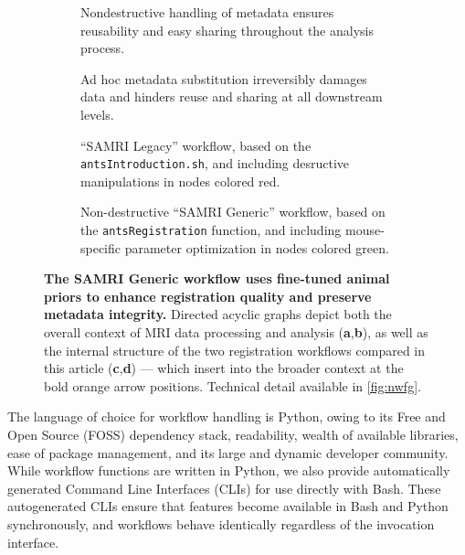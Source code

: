 \begin{figure*}[h!]
	\vspace{-1.8em}
	\begin{subfigure}{\textwidth}
		\centering
		\vspace{-3em}
		\caption{
			Nondestructive handling of metadata ensures reusability and easy sharing throughout the analysis process.
			}
		\label{fig:mdg}
	\vspace{-0.3em}
	\end{subfigure}
	\begin{subfigure}{\textwidth}
		\centering
		\vspace{-3em}
		\caption{
			Ad hoc metadata substitution irreversibly damages data and hinders reuse and sharing at all downstream levels.
			}
		\label{fig:mdb}
	\vspace{-0.5em}
	\end{subfigure}
	\begin{subfigure}{.39\textwidth}
		\centering
		\vspace{-0.8em}
		\caption{
			“SAMRI Legacy” workflow, based on the \textcolor{mg}{\texttt{antsIntroduction.sh}}, and including desructive manipulations in nodes colored red.
			}
		\label{fig:wfgl}
	\end{subfigure}\hfill
	\begin{subfigure}{.58\textwidth}
		\centering
		\vspace{-2.1em}
		\caption{
			Non-destructive “SAMRI Generic” workflow, based on the \textcolor{mg}{\texttt{antsRegistration}} function, and including mouse-specific parameter optimization in nodes colored green.
			}
		\label{fig:wfgg}
	\end{subfigure}
	\caption{
		\textbf{The SAMRI Generic workflow uses fine-tuned animal priors to enhance registration quality and preserve metadata integrity.}
		Directed acyclic graphs depict both the overall context of MRI data processing and analysis (\textbf{a},\textbf{b}), as well as the internal structure of the two registration workflows compared in this article (\textbf{c},\textbf{d}) --- which insert into the broader context at the bold orange arrow positions.
		Technical detail available in \cref{fig:nwfg}.
		}
	\label{fig:wfg}
\end{figure*}

The language of choice for workflow handling is Python, owing to its Free and Open Source (FOSS) dependency stack, readability, wealth of available libraries, ease of package management, and its large and dynamic developer community.
While workflow functions are written in Python, we also provide automatically generated Command Line Interfaces (CLIs) for use directly with Bash.
These autogenerated CLIs ensure that features become available in Bash and Python synchronously, and workflows behave identically regardless of the invocation interface.

